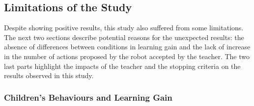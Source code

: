 
\subsection{Limitations of the Study}

Despite showing positive results, this study also suffered from some limitations. The next two sections describe potential reasons for the unexpected results: the absence of differences between conditions in learning gain and the lack of increase in the number of actions proposed by the robot accepted by the teacher. The two last parts highlight the impacts of the teacher and the stopping criteria on the results observed in this study.

\subsubsection{Children's Behaviours and Learning Gain}

%
%
%

